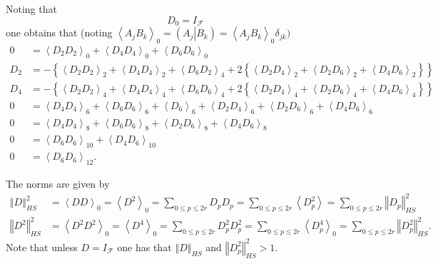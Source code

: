 \documentclass[aps,preprint]{revtex4}%
\begin{document}
Noting that
\begin{equation}
D_{0}=I_{\mathcal{F}}%
\end{equation}
one obtains that (noting $\left\langle A_{j}B_{k}\right\rangle _{0}=\left(
\left.  A_{j}\right\vert B_{k}\right)  =\left\langle A_{j}B_{k}\right\rangle
_{0}\delta_{jk})$
\begin{align}
0  &  =\left\langle D_{2}D_{2}\right\rangle _{0}+\left\langle D_{4}%
D_{4}\right\rangle _{0}+\left\langle D_{6}D_{6}\right\rangle _{0}\\
D_{2}  &  =-\left\{  \left\langle D_{2}D_{2}\right\rangle _{2}+\left\langle
D_{4}D_{4}\right\rangle _{2}+\left\langle D_{6}D_{2}\right\rangle
_{4}+2\left\{  \left\langle D_{2}D_{4}\right\rangle _{2}+\left\langle
D_{2}D_{6}\right\rangle _{2}+\left\langle D_{4}D_{6}\right\rangle
_{2}\right\}  \right\} \\
D_{4}  &  =-\left\{  \left\langle D_{2}D_{2}\right\rangle _{4}+\left\langle
D_{4}D_{4}\right\rangle _{4}+\left\langle D_{6}D_{6}\right\rangle
_{4}+2\left\{  \left\langle D_{2}D_{4}\right\rangle _{4}+\left\langle
D_{2}D_{6}\right\rangle _{4}+\left\langle D_{4}D_{6}\right\rangle
_{4}\right\}  \right\} \\
0  &  =\left\langle D_{4}D_{4}\right\rangle _{6}+\left\langle D_{6}%
D_{6}\right\rangle _{6}+\left\langle D_{6}\right\rangle _{6}+\left\langle
D_{2}D_{4}\right\rangle _{6}+\left\langle D_{2}D_{6}\right\rangle
_{6}+\left\langle D_{4}D_{6}\right\rangle _{6}\\
0  &  =\left\langle D_{4}D_{4}\right\rangle _{8}+\left\langle D_{6}%
D_{6}\right\rangle _{8}+\left\langle D_{2}D_{6}\right\rangle _{8}+\left\langle
D_{4}D_{6}\right\rangle _{8}\\
0  &  =\left\langle D_{6}D_{6}\right\rangle _{10}+\left\langle D_{4}%
D_{6}\right\rangle _{10}\\
0  &  =\left\langle D_{6}D_{6}\right\rangle _{12}.
\end{align}


The norms are given by%
\begin{align}
\left\Vert D\right\Vert _{HS}^{2} &  =\left\langle DD\right\rangle
_{0}=\left\langle D^{2}\right\rangle _{0}=\sum_{0\leq p\leq2r}D_{p}D_{p}%
=\sum_{0\leq p\leq2r}\left\langle D_{p}^{2}\right\rangle =\sum_{0\leq p\leq
2r}\left\Vert D_{p}\right\Vert _{HS}^{2}\\
\left\Vert D^{2}\right\Vert _{HS}^{2} &  =\left\langle D^{2}D^{2}\right\rangle
_{0}=\left\langle D^{4}\right\rangle _{0}=\sum_{0\leq p\leq2r}D_{p}^{2}%
D_{p}^{2}=\sum_{0\leq p\leq2r}\left\langle D_{p}^{4}\right\rangle _{0}%
=\sum_{0\leq p\leq2r}\left\Vert D_{p}^{2}\right\Vert _{HS}^{2}.
\end{align}
Note that unless $D=I_{\mathcal{F}}$ one has that $\left\Vert D\right\Vert
_{HS}$ and $\left\Vert D_{p}^{2}\right\Vert _{HS}^{2}>1.$
\end{document}
